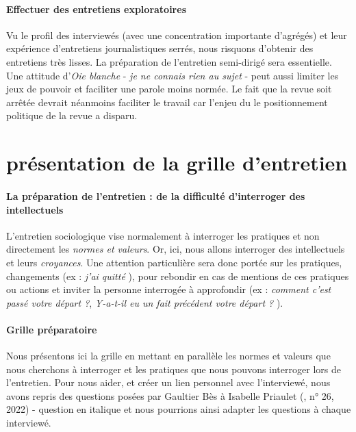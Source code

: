 \paragraph{Effectuer des entretiens exploratoires } Vu le profil des interviewés (avec une concentration importante d'agrégés) et leur expérience d'entretiens journalistiques serrés, nous risquons d'obtenir des entretiens très lisses. La préparation de l'entretien semi-dirigé sera essentielle. Une attitude d'\textit{Oie blanche} - \textit{je ne connais rien au sujet} - peut aussi limiter les jeux de pouvoir et faciliter une parole moins normée. Le fait que la revue soit arrêtée devrait néanmoins faciliter le travail car l'enjeu du le positionnement politique de la revue a disparu. 

  



\section{présentation de la grille d’entretien }
 
 
\paragraph{La préparation de l'entretien : de la difficulté d'interroger des intellectuels} L'entretien sociologique vise normalement à interroger les pratiques et non directement les \textit{normes et valeurs}. Or, ici, nous allons interroger des intellectuels et leurs \textit{croyances}. Une attention particulière sera donc portée sur les pratiques, changements (ex : \textit{j'ai quitté }\RLimite), pour rebondir en cas de mentions de ces pratiques ou actions et inviter la personne interrogée à approfondir  (ex : \textit{comment c'est passé votre départ ?}, \textit{Y-a-t-il eu un fait précédent votre départ ? }). 


\paragraph{Grille préparatoire } Nous présentons ici la grille en mettant en parallèle les normes et valeurs que nous cherchons à interroger et les pratiques que nous pouvons interroger lors de l'entretien. Pour nous aider, et créer un lien personnel avec l'interviewé, nous avons repris des questions posées par Gaultier Bès à Isabelle Priaulet (\RLimite, n° 26, 2022) - question en italique et nous pourrions ainsi adapter les questions à chaque interviewé.  
 
